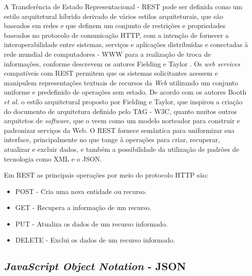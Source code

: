 A Transferência de Estado Representacional - \acrshort{REST} pode ser definida como um estilo arquitetural híbrido derivado de vários estilos arquiteturais, que são baseados em redes e que definem um conjunto de restrições e propriedades baseados no protocolo de comunicação \acrshort{HTTP}, com a intenção de fornecer a interoperabilidade entre sistemas, serviços e aplicações distribuídas e conectadas à rede mundial de computadores - \acrshort{WWW} para a realização de troca de informações, conforme descrevem os autores Fielding e Taylor \cite{fielding2000architectural}. Os \textit{web services} compatíveis com \acrshort{REST} permitem que os sistemas solicitantes acessem e manipulem representações textuais de recursos da \textit{Web} utilizando um conjunto uniforme e predefinido de operações sem estado. De acordo com os autores Booth \textit{et al.} \cite{booth2013web} o estilo arquitetural proposto por Fielding e Taylor, que inspirou a criação do documento de arquitetura definido pelo \acrshort{TAG} - \acrshort{W3C},  quanto muitos outros arquitetos de \textit{software}, que o veem como um modelo norteador para construir e padronizar serviços da Web. O \acrshort{REST} fornece semântica para uniformizar sua interface, principalmente no que tange à operações para criar, recuperar, atualizar e excluir dados, e  também a possibilidade da utilização de padrões de tecnologia como \acrshort{XML} e o \acrshort{JSON}. 

Em \acrshort{REST} as principais operações por meio do protocolo \acrshort{HTTP} são:

\begin{itemize}

\item POST - Cria uma nova entidade ou recurso. 

\item GET - Recupera a informação de um recurso.

\item PUT - Atualiza os dados de um recurso informado.

\item DELETE - Exclui os dados de um recurso informado.

\end{itemize}


\subsection{\textit{JavaScript Object Notation} - JSON}

